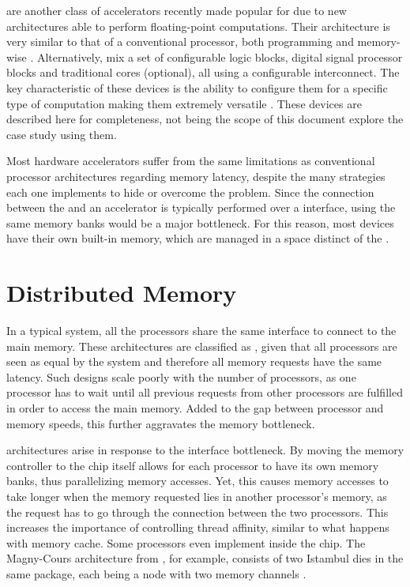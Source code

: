 \documentclass[../thesis]{subfiles}
\begin{document}
		\dsps are another class of accelerators recently made popular for \hpc due to new architectures able to perform floating-point computations. Their architecture is very similar to that of a conventional processor, both programming and memory-wise \cite{FLAWN61}. Alternatively, \fpgas mix a set of configurable logic blocks, digital signal processor blocks and traditional \cpu cores (optional), all using a configurable interconnect. The key characteristic of these devices is the ability to configure them for a specific type of computation making them extremely versatile \cite{Brodtkorb:2010}. These devices are described here for completeness, not being the scope of this document explore the case study using them.

		Most hardware accelerators suffer from the same limitations as conventional processor architectures regarding memory latency, despite the many strategies each one implements to hide or overcome the problem. Since the connection between the \cpu and an accelerator is typically performed over a \pcie interface, using the same memory banks would be a major bottleneck. For this reason, most devices have their own built-in memory, which are managed in a space distinct of the \cpu.


		\section{Distributed Memory}
		In a typical \smp system, all the processors share the same interface to connect to the main memory. These architectures are classified as \uma, given that all processors are seen as equal by the system and therefore all memory requests have the same latency. Such designs scale poorly with the number of processors, as one processor has to wait until all previous requests from other processors are fulfilled in order to access the main memory. Added to the gap between processor and memory speeds, this further aggravates the memory bottleneck.

		\numa architectures arise in response to the interface bottleneck. By moving the memory controller to the \cpu chip itself allows for each processor to have its own memory banks, thus parallelizing memory accesses. Yet, this causes memory accesses to take longer when the memory requested lies in another processor's memory, as the request has to go through the connection between the two processors. This increases the importance of controlling thread affinity, similar to what happens with memory cache. Some processors even implement \numa inside the chip. The Magny-Cours architecture from \amd, for example, consists of two Istambul dies in the same package, each being a \numa node with two memory channels \cite{AMD:MagnyCours}.
\end{document}
